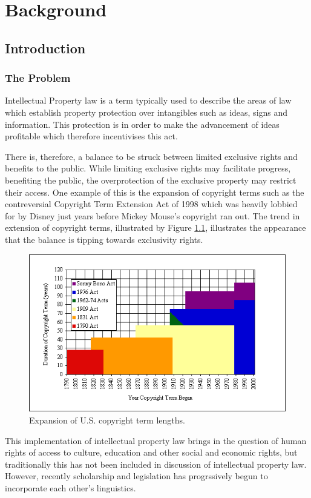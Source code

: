 \chapter{Background}
	\section{Introduction}
		\subsection{The Problem}
			Intellectual Property law is a term typically used to describe the areas of law which establish property protection over intangibles such as ideas, signs and information. This protection is in order to make the advancement of ideas profitable which therefore incentivises this act\cite{ip_edu_bently}.
			
			There is, therefore, a balance to be struck between limited exclusive rights and benefits to the public. While limiting exclusive rights may facilitate progress, benefiting the public, the overprotection of the exclusive property may restrict their access\cite{handbook_ip_hr_geiger}. One example of this is the expansion of copyright terms such as the contreversial Copyright Term Extension Act of 1998 which was heavily lobbied for by Disney just years before Mickey Mouse's copyright ran out\cite{mickey_mouse_grzelak}. The trend in extension of copyright terms, illustrated by Figure \ref{fig:ext_us_cop}, illustrates the appearance that the balance is tipping towards exclusivity rights. 

			\begin{figure}[h]
    			\centering
    			\includegraphics[width=0.5\linewidth]{resources/images/extention_of_us_copyright.png}
    			\caption{Expansion of U.S. copyright term lengths\cite{copyright_term_length_graph_bell}.}
    			\label{fig:ext_us_cop}
			\end{figure}
			
			
			This implementation of intellectual property law brings in the question of human rights of access to culture, education and other social and economic rights, but traditionally this has not been included in discussion of intellectual property law\cite{mapping_ip_hr_helfer}. However, recently scholarship and legislation has progrssively begun to incorporate each other's linguistics\cite{bileta_proposal_blakely}.
			
